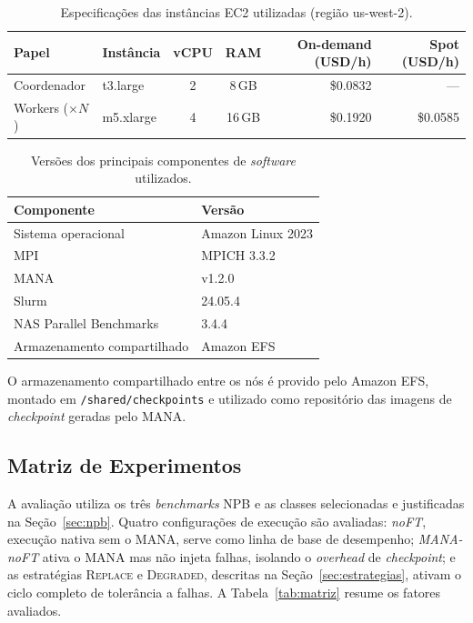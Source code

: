 \begin{table}[htb]
  \caption{Especificações das instâncias EC2 utilizadas (região us-west-2).}
  \label{tab:hardware}
  \centering
  \begin{tabular}{llccrr}
    \toprule
    Papel & Instância & vCPU & RAM & On-demand (USD/h) & Spot (USD/h) \\
    \midrule
    Coordenador          & t3.large   & 2 & 8\,GB  & \$0.0832 & {---} \\
    Workers ($\times N$) & m5.xlarge  & 4 & 16\,GB & \$0.1920 & \$0.0585 \\
    \bottomrule
  \end{tabular}
\end{table}

\begin{table}[htb]
  \caption{Versões dos principais componentes de \textit{software} utilizados.}
  \label{tab:software}
  \centering
  \begin{tabular}{ll}
    \toprule
    Componente & Versão \\
    \midrule
    Sistema operacional & Amazon Linux 2023 \\
    MPI                 & MPICH 3.3.2 \\
    MANA                & v1.2.0 \\
    Slurm               & 24.05.4 \\
    NAS Parallel Benchmarks & 3.4.4 \\
    Armazenamento compartilhado & Amazon EFS \\
    \bottomrule
  \end{tabular}
\end{table}

O armazenamento compartilhado entre os nós é provido pelo Amazon EFS, montado em
\texttt{/shared/checkpoints} e utilizado como repositório das imagens de
\textit{checkpoint} geradas pelo MANA.

\subsection{Matriz de Experimentos}
\label{sec:matriz}

A avaliação utiliza os três \textit{benchmarks} NPB e as classes selecionadas e
justificadas na Seção~\ref{sec:npb}. Quatro configurações de execução são avaliadas:
\textit{noFT}, execução nativa sem o MANA, serve como linha de base de desempenho;
\textit{MANA-noFT} ativa o MANA mas não injeta falhas, isolando o \textit{overhead}
de \textit{checkpoint}; e as estratégias \textsc{Replace} e \textsc{Degraded}, descritas na
Seção~\ref{sec:estrategias}, ativam o ciclo completo de tolerância a falhas.
A Tabela~\ref{tab:matriz} resume os fatores avaliados.

